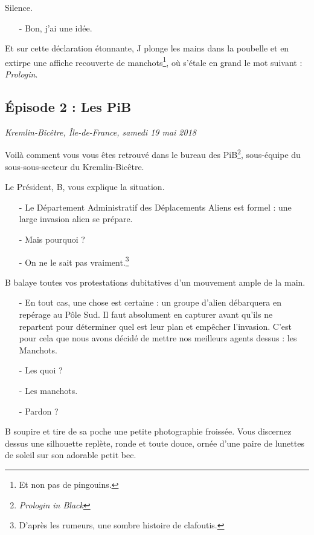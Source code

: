 Silence.

\begin{itemize}
\item[-] Bon, j'ai une idée.
\end{itemize}

Et sur cette déclaration étonnante, J plonge les mains dans la poubelle et en
extirpe une affiche recouverte de manchots\footnote{Et non pas de pingouins.},
où s'étale en grand le mot suivant : \emph{Prologin}.

\subsection{Épisode 2 : Les PiB}
\hfill \textit{Kremlin-Bicêtre, Île-de-France, samedi 19 mai 2018}

Voilà comment vous vous êtes retrouvé dans le bureau des
PiB\footnote{\emph{Prologin in Black}\texttrademark}, sous-équipe du
sous-sous-secteur du Kremlin-Bicêtre.

Le Président, B, vous explique la situation.

\begin{itemize}
    \item[-] Le Département Administratif des Déplacements Aliens est formel :
        une large invasion alien se prépare.
    \item[-] Mais pourquoi ?
    \item[-] On ne le sait pas vraiment.\footnote{D'après les rumeurs, une
        sombre histoire de clafoutis.}
\end{itemize}
B balaye toutes vos protestations dubitatives d'un mouvement ample de la main.
\begin{itemize}
    \item[-] En tout cas, une chose est certaine : un groupe d'alien débarquera
        en repérage au Pôle Sud. Il faut absolument en capturer avant qu'ils ne
        repartent pour déterminer quel est leur plan et empêcher l'invasion.
        C'est pour cela que nous avons décidé de mettre nos meilleurs agents
        dessus : les Manchots.
    \item[-] Les quoi ?
    \item[-] Les manchots.
    \item[-] Pardon ?
\end{itemize}

B soupire et tire de sa poche une petite photographie froissée. Vous discernez
dessus une silhouette replète, ronde et toute douce, ornée d'une paire de
lunettes de soleil sur son adorable petit bec.

